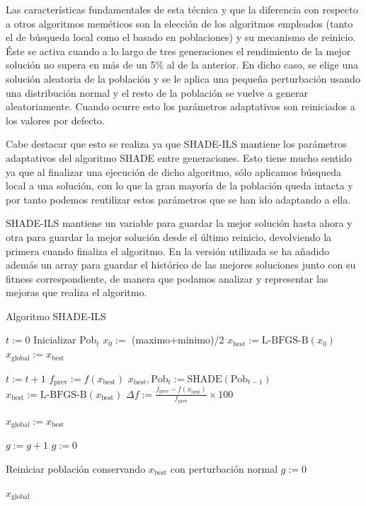 Las características fundamentales de esta técnica y que la diferencia con respecto a otros algoritmos meméticos son la elección de los algoritmos empleados (tanto el de búsqueda local como el basado en poblaciones) y su mecanismo de reinicio. Éste se activa cuando a lo largo de tres generaciones el rendimiento de la mejor solución no supera en más de un 5\% al de la anterior. En dicho caso, se elige una solución aleatoria de la población y se le aplica una pequeña perturbación usando una distribución normal y el resto de la población se vuelve a generar aleatoriamente. Cuando ocurre esto los parámetros adaptativos son reiniciados a los valores por defecto.

Cabe destacar que esto se realiza ya que SHADE-ILS mantiene los parámetros adaptativos del algoritmo SHADE entre generaciones. Esto tiene mucho sentido ya que al finalizar una ejecución de dicho algoritmo, sólo aplicamos búsqueda local a una solución, con lo que la gran mayoría de la población queda intacta y por tanto podemos reutilizar estos parámetros que se han ido adaptando a ella. 

SHADE-ILS mantiene un variable para guardar la mejor solución hasta ahora y otra para guardar la mejor solución desde el último reinicio, devolviendo la primera cuando finaliza el algoritmo. En la versión utilizada se ha añadido además un array para guardar el histórico de las mejores soluciones junto con su fitness correspondiente, de manera que podamos analizar y representar las mejoras que realiza el algoritmo. 


\begin{algorithm}
\caption{Algoritmo SHADE-ILS}
\label{alg:shade-ils}
	\begin{algorithmic}
		\State $t := 0$
		\State Inicializar Pob$_t$
		\State $x_0 :=$ (maximo+minimo)/2
		\State $x_{\text{best}} := \text{L-BFGS-B}(x_0)$
		\State $x_{\text{global}} := x_{\text{best}}$
		
			\State $t := t+1$
			\State $f_{\text{prev}} := f(x_{\text{best}})$
			\State $x_{\text{best}}, \text{Pob}_t := \text{SHADE}(\text{Pob}_{t-1})$
			\State $x_{\text{best}} := \text{L-BFGS-B}(x_{\text{best}})$
			\State $\Delta f := \frac{f_{\text{prev}} - f(x_{\text{best}})}{f_{\text{prev}}} \times 100$
			
				\State $x_{\text{global}} := x_{\text{best}}$
			\EndIf
			
				\State $g := g + 1$
			\Else
				\State $g := 0$
			\EndIf
			
				\State Reiniciar población conservando $x_{\text{best}}$ con perturbación normal
				\State $g := 0$
			\EndIf	
		\EndWhile
		
		\Return $x_{\text{global}}$
	\end{algorithmic}
\end{algorithm}


